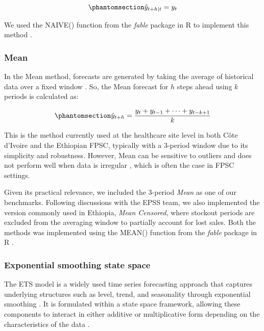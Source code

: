 \documentclass[
  authoryear,
  doubleblind,
  3p]{elsarticle}
\begin{document}
\begin{equation}\phantomsection\label{eq-naive_wp2}{
\hat{y}_{t+h|t} = y_t
}\end{equation}

We used the NAIVE() function from the \emph{fable} package in R to
implement this method \citep{fable2022}.

\subsubsection{Mean}\label{mean}

In the Mean method, forecasts are generated by taking the average of
historical data over a fixed window \citep{hyndman2021forecasting}. So,
the Mean forecast for \(h\) steps ahead using \(k\) periods is
calculated as:

\begin{equation}\phantomsection\label{eq-mean_wp2}{
\hat{y}_{t+h} = \frac{y_t + y_{t-1} + \cdots + y_{t-k+1}}{k}
}\end{equation}

This is the method currently used at the healthcare site level in both
Côte d'Ivoire and the Ethiopian FPSC, typically with a 3-period window
due to its simplicity and robustness. However, Mean can be sensitive to
outliers and does not perform well when data is irregular
\citep{barrow2016}, which is often the case in FPSC settings.

Given its practical relevance, we included the 3-period \emph{Mean} as
one of our benchmarks. Following discussions with the EPSS team, we also
implemented the version commonly used in Ethiopia, \emph{Mean Censored},
where stockout periods are excluded from the averaging window to
partially account for lost sales. Both the methods was implemented using
the MEAN() function from the \emph{fable} package in R
\citep{fable2022}.

\subsubsection{Exponential smoothing state
space}\label{exponential-smoothing-state-space}

The ETS model is a widely used time series forecasting approach that
captures underlying structures such as level, trend, and seasonality
through exponential smoothing \citep{kolassa2023}. It is formulated
within a state space framework, allowing these components to interact in
either additive or multiplicative form depending on the characteristics
of the data \citep{hyndman2021forecasting}.
\end{document}
